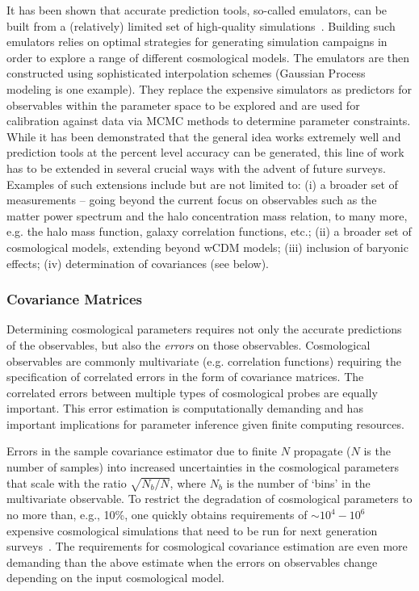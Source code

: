 It has been shown that accurate prediction tools, so-called emulators,
can be built from a (relatively) limited set of high-quality
simulations~\cite{emu}. Building such emulators relies on optimal
strategies for generating simulation campaigns in order to explore a
range of different cosmological models. The emulators are then
constructed using sophisticated interpolation schemes (Gaussian
Process modeling is one example). They replace the expensive
simulators as predictors for observables within the parameter space to
be explored and are used for calibration against data via MCMC methods
to determine parameter constraints. While it has been demonstrated
that the general idea works extremely well and prediction tools at the
percent level accuracy can be generated, this line of work has to be
extended in several crucial ways with the advent of future
surveys. Examples of such extensions include but are not limited to:
(i) a broader set of measurements -- going beyond the current focus on
observables such as the matter power spectrum and the halo
concentration mass relation, to many more, e.g. the halo mass
function, galaxy correlation functions, etc.; (ii) a broader set of
cosmological models, extending beyond wCDM models; (iii) inclusion of
baryonic effects; (iv) determination of covariances (see below).

\subsubsection{Covariance Matrices}

Determining cosmological parameters requires not only the accurate
predictions of the observables, but also the \emph{errors} on those
observables. Cosmological observables are commonly multivariate
(e.g. correlation functions) requiring the specification of correlated
errors in the form of covariance matrices. The correlated errors
between multiple types of cosmological probes are equally
important. This error estimation is computationally demanding and has
important implications for parameter inference given finite computing
resources.

Errors in the sample covariance estimator due to finite $N$ propagate
($N$ is the number of samples) into increased uncertainties in the
cosmological parameters that scale with the ratio $\sqrt{N_b/N}$,
where $N_b$ is the number of `bins' in the multivariate observable. To
restrict the degradation of cosmological parameters to no more than,
e.g., 10\%, one quickly obtains requirements of $\sim10^{4}-10^{6}$
expensive cosmological simulations that need to be run for next
generation surveys~\cite{cov}. The requirements for
cosmological covariance estimation are even more demanding than the
above estimate when the errors on observables change depending on the
input cosmological model.

